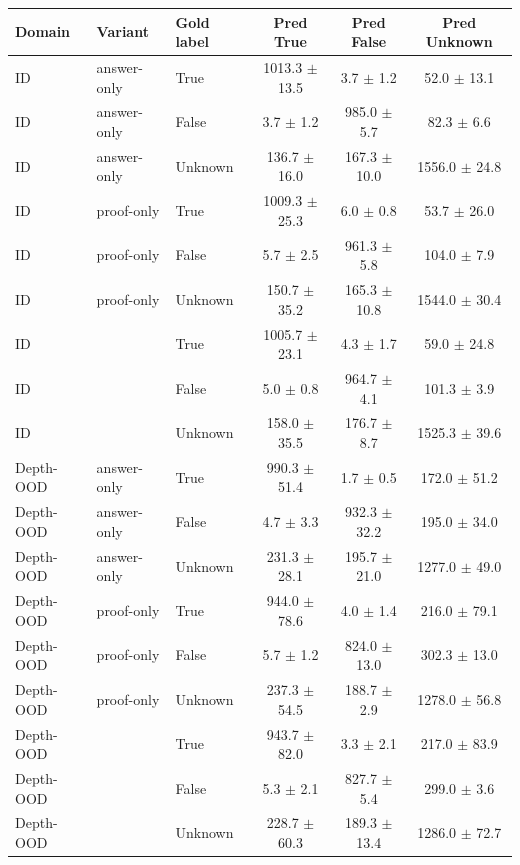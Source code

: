\begin{tabular}{lllccc}
\toprule
Domain & Variant & Gold label & Pred True & Pred False & Pred Unknown \\
\midrule
ID & answer-only & True & 1013.3 $\pm$ 13.5 & 3.7 $\pm$ 1.2 & 52.0 $\pm$ 13.1 \\
ID & answer-only & False & 3.7 $\pm$ 1.2 & 985.0 $\pm$ 5.7 & 82.3 $\pm$ 6.6 \\
ID & answer-only & Unknown & 136.7 $\pm$ 16.0 & 167.3 $\pm$ 10.0 & 1556.0 $\pm$ 24.8 \\
ID & proof-only & True & 1009.3 $\pm$ 25.3 & 6.0 $\pm$ 0.8 & 53.7 $\pm$ 26.0 \\
ID & proof-only & False & 5.7 $\pm$ 2.5 & 961.3 $\pm$ 5.8 & 104.0 $\pm$ 7.9 \\
ID & proof-only & Unknown & 150.7 $\pm$ 35.2 & 165.3 $\pm$ 10.8 & 1544.0 $\pm$ 30.4 \\
ID & \model{} & True & 1005.7 $\pm$ 23.1 & 4.3 $\pm$ 1.7 & 59.0 $\pm$ 24.8 \\
ID & \model{} & False & 5.0 $\pm$ 0.8 & 964.7 $\pm$ 4.1 & 101.3 $\pm$ 3.9 \\
ID & \model{} & Unknown & 158.0 $\pm$ 35.5 & 176.7 $\pm$ 8.7 & 1525.3 $\pm$ 39.6 \\
\midrule
Depth-OOD & answer-only & True & 990.3 $\pm$ 51.4 & 1.7 $\pm$ 0.5 & 172.0 $\pm$ 51.2 \\
Depth-OOD & answer-only & False & 4.7 $\pm$ 3.3 & 932.3 $\pm$ 32.2 & 195.0 $\pm$ 34.0 \\
Depth-OOD & answer-only & Unknown & 231.3 $\pm$ 28.1 & 195.7 $\pm$ 21.0 & 1277.0 $\pm$ 49.0 \\
Depth-OOD & proof-only & True & 944.0 $\pm$ 78.6 & 4.0 $\pm$ 1.4 & 216.0 $\pm$ 79.1 \\
Depth-OOD & proof-only & False & 5.7 $\pm$ 1.2 & 824.0 $\pm$ 13.0 & 302.3 $\pm$ 13.0 \\
Depth-OOD & proof-only & Unknown & 237.3 $\pm$ 54.5 & 188.7 $\pm$ 2.9 & 1278.0 $\pm$ 56.8 \\
Depth-OOD & \model{} & True & 943.7 $\pm$ 82.0 & 3.3 $\pm$ 2.1 & 217.0 $\pm$ 83.9 \\
Depth-OOD & \model{} & False & 5.3 $\pm$ 2.1 & 827.7 $\pm$ 5.4 & 299.0 $\pm$ 3.6 \\
Depth-OOD & \model{} & Unknown & 228.7 $\pm$ 60.3 & 189.3 $\pm$ 13.4 & 1286.0 $\pm$ 72.7 \\
\bottomrule
\end{tabular}